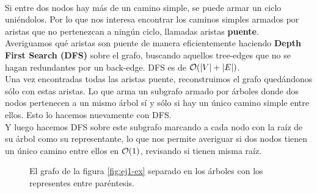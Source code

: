 \documentclass[../main.tex]{subfiles}
\begin{document}
\paragraph{} Si entre dos nodos hay más de un camino simple, se puede armar un ciclo uniéndolos. Por lo que nos interesa encontrar los caminos simples armados por aristas que no pertenezcan a ningún ciclo, llamadas aristas \textbf{puente}. \\ %
Averiguamos qué aristas son puente de manera eficientemente haciendo \textbf{Depth First Search (DFS)} sobre el grafo\cite{TODO}, buscando aquellos tree-edges que no se hagan redundantes por un back-edge. DFS es de \(\mathcal{O}(|V| + |E|)\)\cite{TODO}. \\ %
Una vez encontradas todas las aristas puente, reconstruimos el grafo quedándonos sólo con estas aristas. Lo que arma un subgrafo armado por árboles donde dos nodos pertenecen a un mismo árbol sí y sólo si hay un único camino simple entre ellos. Esto lo hacemos nuevamente con DFS. \\
Y luego hacemos DFS sobre este subgrafo marcando a cada nodo con la raíz de su árbol como su representante, lo que nos permite averiguar si dos nodos tienen un único camino entre ellos en \(\mathcal{O}(1)\), revisando si tienen misma raíz. %

\begin{figure}[H]
\centering

  
\caption{El grafo de la figura \ref{fig:ej1-ex} separado en los árboles con los representes entre paréntesis.}
\label{fig:ej1-res}
\end{figure}
\end{document}
